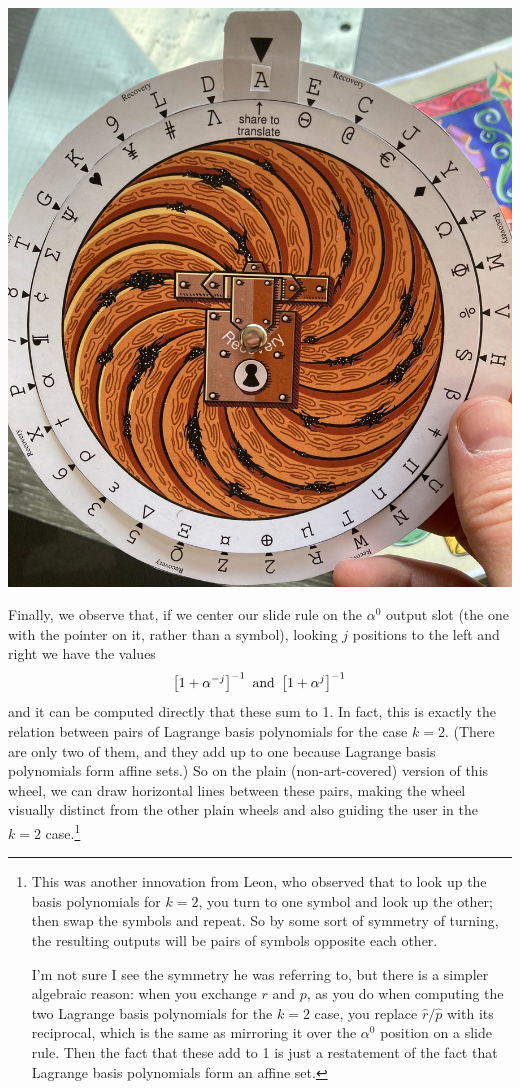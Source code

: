 \documentclass[letterpaper]{article}
\begin{document}
\begin{center}\includegraphics[scale=1.00]{images/recovery-wheel.jpg}\end{center}

Finally, we observe that, if we center our slide rule on the $\alpha^0$ output
slot (the one with the pointer on it, rather than a symbol), looking $j$ positions
to the left and right we have the values
\[ \left[ 1 + \alpha^{-j} \right]^{-1} \textnormal{ and } \left[ 1 + \alpha^j \right]^{-1}  \]
and it can be computed directly that these sum to 1.
In fact, this is exactly the relation between pairs of Lagrange basis polynomials
for the case $k=2$. (There are only two of them, and they add up to one because
Lagrange basis polynomials form affine sets.) So on the plain (non-art-covered)
version of this wheel, we can draw horizontal lines between these pairs, making
the wheel visually distinct from the other plain wheels and also guiding the user
in the $k=2$ case.\footnote{This was another innovation from Leon, who observed that
to look up the basis polynomials for $k=2$, you turn to one symbol and look up the
other; then swap the symbols and repeat. So by some sort of symmetry of turning, the
resulting outputs will be pairs of symbols opposite each other.

I'm not sure I see the symmetry he was referring to, but there is a simpler
algebraic reason: when you exchange $r$ and $p$, as you do when computing the
two Lagrange basis polynomials for the $k=2$ case, you replace $\hat{r}/\hat{p}$
with its reciprocal, which is the same as mirroring it over the $\alpha^0$
position on a slide rule. Then the fact that these add to 1 is just a restatement
of the fact that Lagrange basis polynomials form an affine set.}
\end{document}
